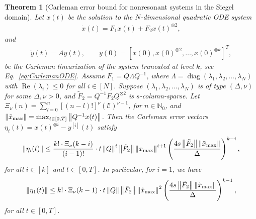 \documentclass[superscriptaddress,onecolumn,nofootinbib,longbibliography,a4paper,accepted=2026-09-29]{quantumarticle}
\theoremstyle{plain}
\newtheorem{thm}{Theorem}
\theoremstyle{definition}
\numberwithin{thm}{section}
\numberwithin{assumption}{section}
\numberwithin{lemma}{section}
\numberwithin{prop}{section}
\numberwithin{cor}{section}
\numberwithin{definition}{section}
\numberwithin{rmk}{section}
\numberwithin{equation}{section}
\newcommand{\norm}[1]     {\left\| #1 \right\|}
\newcommand{\ot}{\otimes}
\newcommand{\myN}{\mathbb{N}}
\newcommand{\lrb}[1]{\left ( #1 \right )}
\newcommand{\realpart}[1]{\operatorname{Re}\lrb{#1}}
\newcommand{\diag}[1]{\operatorname{diag}\lrb{#1}}
\begin{document}
\begin{thm}
[Carleman error bound for nonresonant systems in the Siegel domain]
\label{thm:non-resonant_Siegel}
Let $x(t)$ be the solution to the $N$-dimensional quadratic ODE system
\begin{align}
    \dot{x}(t) = F_1 x(t) + F_2 x(t)^{\ot 2},
\end{align}
and
\begin{align}
    \dot{y}(t) = A y(t),\qquad y(0)=[x(0),x(0)^{\ot 2},\dots,x(0)^{\ot k}]^T,
\end{align}
be the Carleman linearization of the system truncated at level $k$, see Eq.~\eqref{eq:CarlemanODE}. Assume $F_1=Q\Lambda Q^{-1}$, where $\Lambda=\diag{\lambda_1, \lambda_2, \dots, \lambda_N}$ with  $\realpart{\lambda_i} \le 0$ for all $i \in [N]$.
Suppose  $(\lambda_1, \lambda_2, \dots, \lambda_N)$ is of type $(\Delta, \nu)$ for some $\Delta, \nu > 0$, and $\tilde{F}_2 = Q^{-1}F_2 Q^{\otimes 2}$ is $s$-column-sparse. 
Let $\Xi_{\nu}(n)= \sum_{l=0}^n [(n-l)!]^{\nu}(l!)^{\nu-1}$, for $n \in \myN_0$, and $\norm{\tilde{x}_{\rm max}}=\max_{t \in [0,T]} \norm{Q^{-1}x(t)}$. Then the Carleman error vectors $\eta_i(t) = x(t)^{\ot i}-y^{[i]}(t)$ satisfy 
\begin{align}
\norm{\eta_i(t)} \le \frac{k! \cdot \Xi_{\nu}(k-i) }{(i-1)!} \cdot t  \norm{Q}^i \norm{\tilde{F}_2} \norm{x_{\rm max}}^{i+1}
\lrb{\frac{4 s \norm{\tilde{F}_2} \norm{\tilde{x}_{\rm max}}}{\Delta}}^{k-i},
\label{eq:error_bound_ith_block_siegel_domain}
\end{align}
for all $i\in [k]$ and $t \in [0, T]$. In particular, for $i=1$, we have
\begin{align}
\norm{\eta_1(t)} 
\le k! \cdot \Xi_{\nu}(k-1)  \cdot  t
\norm{Q} \norm{\tilde{F}_2} \norm{\tilde{x}_{\rm max}}^2 \lrb{\frac{4 s  \norm{\tilde{F}_2} \norm{\tilde{x}_{\rm max}}}{\Delta}}^{k-1},    
\label{eq:error_bound_1st_block_siegel_domain}
\end{align}
for all $t \in [0, T]$.
\label{thm:error_bound_nonresonant_siegel_domain}
\end{thm}
\end{document}
